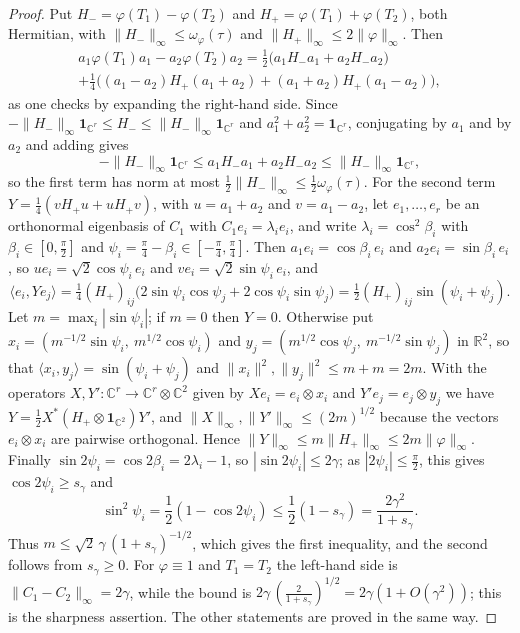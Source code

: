 \begin{proof}
Put $H_-=\varphi(T_1)-\varphi(T_2)$ and $H_+=\varphi(T_1)+\varphi(T_2)$, both Hermitian, with $\|H_-\|_\infty\leq\omega_\varphi(\tau)$ and $\|H_+\|_\infty\leq2\|\varphi\|_\infty$. Then
\begin{multline*}%
a_1\varphi(T_1)a_1-a_2\varphi(T_2)a_2=\tfrac12\big(a_1H_-a_1+a_2H_-a_2\big)\\+\tfrac14\Big((a_1-a_2)H_+(a_1+a_2)+(a_1+a_2)H_+(a_1-a_2)\Big),
\end{multline*}
as one checks by expanding the right-hand side. Since $-\|H_-\|_\infty\mathbf{1}_{\mathbb{C}^r}\leq H_-\leq\|H_-\|_\infty\mathbf{1}_{\mathbb{C}^r}$ and $a_1^2+a_2^2=\mathbf{1}_{\mathbb{C}^r}$, conjugating by $a_1$ and by $a_2$ and adding gives
\[
-\|H_-\|_\infty\mathbf{1}_{\mathbb{C}^r}\leq a_1H_-a_1+a_2H_-a_2\leq\|H_-\|_\infty\mathbf{1}_{\mathbb{C}^r},
\]
so the first term has norm at most $\frac12\|H_-\|_\infty\leq\frac12\omega_\varphi(\tau)$.
For the second term $Y=\frac14(vH_+u+uH_+v)$, with $u=a_1+a_2$ and $v=a_1-a_2$, let $e_1,\dots,e_r$ be an orthonormal eigenbasis of $C_1$ with $C_1e_i=\lambda_ie_i$, and write $\lambda_i=\cos^2\beta_i$ with $\beta_i\in[0,\frac\pi2]$ and $\psi_i=\frac\pi4-\beta_i\in[-\frac\pi4,\frac\pi4]$. Then $a_1e_i=\cos\beta_i\,e_i$ and $a_2e_i=\sin\beta_i\,e_i$, so $ue_i=\sqrt2\cos\psi_i\,e_i$ and $ve_i=\sqrt2\sin\psi_i\,e_i$, and
\[
\langle e_i,Ye_j\rangle=\tfrac14(H_+)_{ij}\big(2\sin\psi_i\cos\psi_j+2\cos\psi_i\sin\psi_j\big)=\tfrac12(H_+)_{ij}\sin(\psi_i+\psi_j).
\]
Let $m=\max_i|\sin\psi_i|$; if $m=0$ then $Y=0$. Otherwise put $x_i=(m^{-1/2}\sin\psi_i,\ m^{1/2}\cos\psi_i)$ and $y_j=(m^{1/2}\cos\psi_j,\ m^{-1/2}\sin\psi_j)$ in $\mathbb{R}^2$, so that $\langle x_i,y_j\rangle=\sin(\psi_i+\psi_j)$ and $\|x_i\|^2,\|y_j\|^2\leq m+m=2m$. With the operators $X,Y'\colon\mathbb{C}^r\to\mathbb{C}^r\otimes\mathbb{C}^2$ given by $Xe_i=e_i\otimes x_i$ and $Y'e_j=e_j\otimes y_j$ we have $Y=\frac12X^*(H_+\otimes\mathbf{1}_{\mathbb{C}^2})Y'$, and $\|X\|_\infty,\|Y'\|_\infty\leq(2m)^{1/2}$ because the vectors $e_i\otimes x_i$ are pairwise orthogonal. Hence $\|Y\|_\infty\leq m\|H_+\|_\infty\leq2m\|\varphi\|_\infty$. Finally $\sin2\psi_i=\cos2\beta_i=2\lambda_i-1$, so $|\sin2\psi_i|\leq2\gamma$; as $|2\psi_i|\leq\frac\pi2$, this gives $\cos2\psi_i\geq s_\gamma$ and
\[
\sin^2\psi_i=\frac12(1-\cos2\psi_i)\leq\frac12(1-s_\gamma)=\frac{2\gamma^2}{1+s_\gamma}.
\]
Thus $m\leq\sqrt2\,\gamma\,(1+s_\gamma)^{-1/2}$, which gives the first inequality, and the second follows from $s_\gamma\geq0$. For $\varphi\equiv1$ and $T_1=T_2$ the left-hand side is $\|C_1-C_2\|_\infty=2\gamma$, while the bound is $2\gamma\,(\frac{2}{1+s_\gamma})^{1/2}=2\gamma(1+O(\gamma^2))$; this is the sharpness assertion. The other statements are proved in the same way.
\end{proof}

